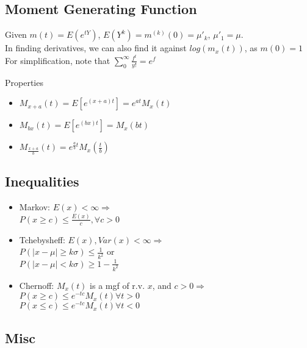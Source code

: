 \documentclass[12pt]{article}
\newcommand{\abs}[1]{\left|#1\right|}
\begin{document}
\subsection{Moment Generating Function}

Given $m(t) = E(e^{tY})$, $E(Y^k) = m^{(k)}(0) = \mu'_k$, $\mu'_1 = \mu$. \\
In finding derivatives, we can also find it against $log(m_x(t))$, as $m(0) = 1$ \\

For simplification, note that $\sum_0^\infty \frac{f^t}{y!} = e^f$

Properties 
\begin{itemize}
	\item $M_{x + a}(t) = E[e^{(x + a)t}] = e^{at} M_x(t)$
	\item $M_{bx}(t) = E[e^{(bx)t}] = M_x(bt)$
	\item $M_{\frac{x + a}{b}}(t) = e^{\frac{a}{b}t} M_x(\frac{t}{b})$
\end{itemize}

\subsection{Inequalities}
\begin{itemize}
	\item Markov: $E(x) < \infty \Rightarrow$ \\
	$P(x \ge c) \le \frac{E(x)}{c}, \forall c > 0$
	\item Tchebysheff: $E(x), Var(x) < \infty \Rightarrow$ \\
	$P(\abs{x - \mu} \ge k\sigma) \le \frac{1}{k^2}$ or \\
	$P(\abs{x - \mu} < k\sigma) \ge 1 - \frac{1}{k^2}$
	\item Chernoff: $M_x(t)$ is a mgf of r.v. $x$, and $c > 0 \Rightarrow$ \\
	$P(x \ge c) \le e^{-tc} M_x(t) \forall t > 0$ \\
	$P(x \le c) \le e^{-tc} M_x(t) \forall t < 0$
\end{itemize}

\subsection{Misc}
\end{document}
